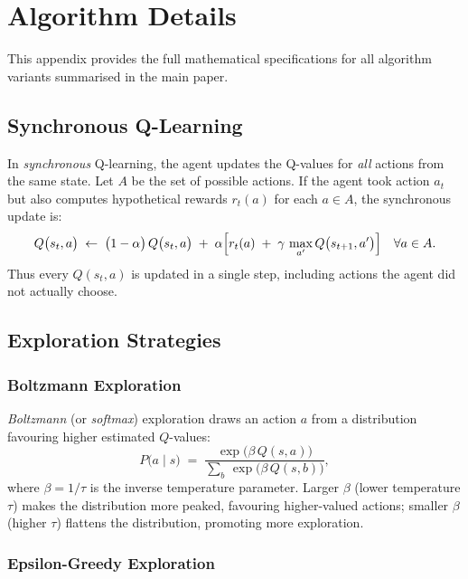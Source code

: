 \section{Algorithm Details}
\label{sec:appendix_algorithms}

This appendix provides the full mathematical specifications for all algorithm variants summarised in the main paper.

\subsection{Synchronous Q-Learning}

In \emph{synchronous} Q-learning, the agent updates the Q-values for \emph{all} actions from the same state. Let $A$ be the set of possible actions. If the agent took action $a_t$ but also computes hypothetical rewards $r_t(a)$ for each $a \in A$, the synchronous update is:
\begin{equation}
Q\bigl(s_t,a\bigr)
\;\leftarrow\;
\bigl(1-\alpha\bigr)\,Q\bigl(s_t,a\bigr)
\;+\;
\alpha \Bigl[
  r_t(a)
  \;+\;
  \gamma \,\max_{a'} Q\bigl(s_{t+1},a'\bigr)
\Bigr]
\quad
\forall a \in A.
\label{eq:qlearning_sync}
\end{equation}
Thus every $Q(s_t,a)$ is updated in a single step, including actions the agent did not actually choose.

\subsection{Exploration Strategies}

\subsubsection{Boltzmann Exploration}

\emph{Boltzmann} (or \emph{softmax}) exploration draws an action $a$ from a distribution favouring higher estimated $Q$-values:
\begin{equation}
P\bigl(a \mid s\bigr)
\;=\;
\frac{\exp\!\bigl(\beta\,Q(s,a)\bigr)}{\sum_{b}\,\exp\!\bigl(\beta\,Q(s,b)\bigr)},
\label{eq:boltzmann}
\end{equation}
where $\beta = 1/\tau$ is the inverse temperature parameter. Larger $\beta$ (lower temperature $\tau$) makes the distribution more peaked, favouring higher-valued actions; smaller $\beta$ (higher $\tau$) flattens the distribution, promoting more exploration.

\subsubsection{Epsilon-Greedy Exploration}

